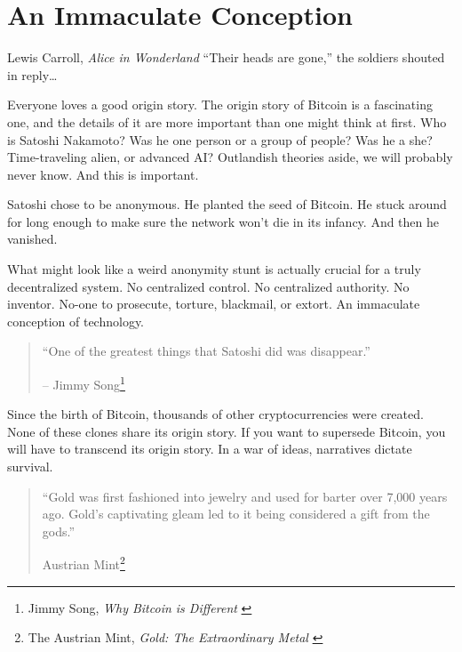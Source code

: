 \chapter{An Immaculate Conception}
\label{les:5}

\begin{chapquote}{Lewis Carroll, \textit{Alice in Wonderland}}
\enquote{Their heads are gone,} the soldiers shouted in reply\ldots
\end{chapquote}

Everyone loves a good origin story. The origin story of Bitcoin is a
fascinating one, and the details of it are more important than one might
think at first. Who is Satoshi Nakamoto? Was he one person or a group of
people? Was he a she? Time-traveling alien, or advanced AI? Outlandish
theories aside, we will probably never know. And this is important.

Satoshi chose to be anonymous. He planted the seed of Bitcoin. He stuck
around for long enough to make sure the network won't die in its
infancy. And then he vanished.

What might look like a weird anonymity stunt is actually crucial for a
truly decentralized system. No centralized control. No centralized
authority. No inventor. No-one to prosecute, torture, blackmail, or
extort. An immaculate conception of technology.

\begin{quotation}\begin{samepage}
\enquote{One of the greatest things that Satoshi did was disappear.}
\begin{flushright} -- Jimmy Song\footnote{Jimmy Song, \textit{Why Bitcoin is Different} \cite{bitcoin-different}}
\end{flushright}\end{samepage}\end{quotation}

\newpage

Since the birth of Bitcoin, thousands of other cryptocurrencies were
created. None of these clones share its origin story. If you want to
supersede Bitcoin, you will have to transcend its origin story. In a war
of ideas, narratives dictate survival.

\begin{quotation}\begin{samepage}
\enquote{Gold was first fashioned into jewelry and used for barter over 7,000
years ago. Gold's captivating gleam led to it being considered a gift
from the gods.}
\begin{flushright} Austrian Mint\footnote{The Austrian Mint, \textit{Gold: The Extraordinary Metal} \cite{gold-gift-gods}}
\end{flushright}\end{samepage}\end{quotation}

